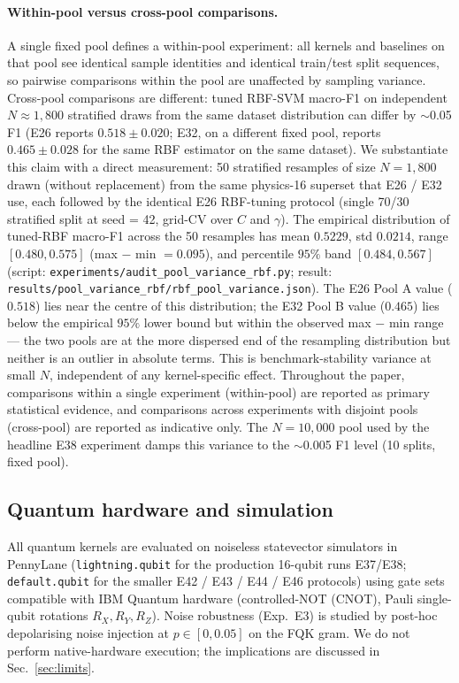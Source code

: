 \documentclass[pdflatex,sn-mathphys]{sn-jnl}
\theoremstyle{plain}
\theoremstyle{remark}
\theoremstyle{definition}
\begin{document}
\paragraph{Within-pool versus cross-pool comparisons.}
A single fixed pool defines a within-pool experiment: all kernels and baselines on that pool see identical sample identities and identical train/test split sequences, so pairwise comparisons within the pool are unaffected by sampling variance.  Cross-pool comparisons are different: tuned RBF-SVM macro-F1 on independent $N\!\approx\!1{,}800$ stratified draws from the same dataset distribution can differ by $\sim$0.05 F1 (E26 reports $0.518\pm 0.020$; E32, on a different fixed pool, reports $0.465\pm 0.028$ for the same RBF estimator on the same dataset).  We substantiate this claim with a direct measurement: 50 stratified resamples of size $N=1{,}800$ drawn (without replacement) from the same physics-16 superset that E26 / E32 use, each followed by the identical E26 RBF-tuning protocol (single 70/30 stratified split at seed = 42, grid-CV over $C$ and $\gamma$).  The empirical distribution of tuned-RBF macro-F1 across the 50 resamples has mean $0.5229$, std $0.0214$, range $[0.480, 0.575]$ (max $-$ min $= 0.095$), and percentile $95\%$ band $[0.484, 0.567]$ (script: \texttt{experiments/audit\_pool\_variance\_rbf.py}; result: \texttt{results/pool\_variance\_rbf/rbf\_pool\_variance.json}).  The E26 Pool A value ($0.518$) lies near the centre of this distribution; the E32 Pool B value ($0.465$) lies below the empirical $95\%$ lower bound but within the observed max $-$ min range --- the two pools are at the more dispersed end of the resampling distribution but neither is an outlier in absolute terms.  This is benchmark-stability variance at small $N$, independent of any kernel-specific effect.  Throughout the paper, comparisons within a single experiment (within-pool) are reported as primary statistical evidence, and comparisons across experiments with disjoint pools (cross-pool) are reported as indicative only.  The $N=10{,}000$ pool used by the headline E38 experiment damps this variance to the $\sim$0.005 F1 level (10 splits, fixed pool).

\subsection{Quantum hardware and simulation}
All quantum kernels are evaluated on noiseless statevector simulators in PennyLane (\texttt{lightning.qubit} for the production 16-qubit runs E37/E38; \texttt{default.qubit} for the smaller E42 / E43 / E44 / E46 protocols) using gate sets compatible with IBM Quantum hardware (controlled-NOT (CNOT), Pauli single-qubit rotations $R_X, R_Y, R_Z$). Noise robustness (Exp.\ E3) is studied by post-hoc depolarising noise injection at $p\in [0,0.05]$ on the FQK gram. We do not perform native-hardware execution; the implications are discussed in Sec.~\ref{sec:limits}.
\end{document}
